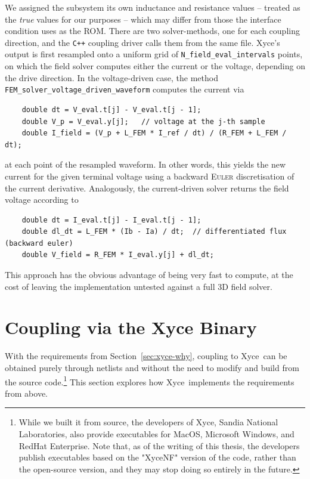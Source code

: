 We assigned the subsystem its own inductance and resistance values -- treated as the \textit{true} values for our purposes -- which may differ from those the interface condition uses as the ROM. There are two solver-methods, one for each coupling direction, and the \lstinline{C++} coupling driver calls them from the same file. Xyce's output is first resampled onto a uniform grid of \lstinline{N_field_eval_intervals} points, on which the field solver computes either the current or the voltage, depending on the drive direction. In the voltage-driven case, the method \lstinline{FEM_solver_voltage_driven_waveform} computes the current via
\begin{lstlisting}
    double dt = V_eval.t[j] - V_eval.t[j - 1];
    double V_p = V_eval.y[j];   // voltage at the j-th sample
    double I_field = (V_p + L_FEM * I_ref / dt) / (R_FEM + L_FEM / dt);
\end{lstlisting}
at each point of the resampled waveform. In other words, this yields the new current for the given terminal voltage using a backward \textsc{Euler} discretisation of the current derivative. Analogously, the current-driven solver returns the field voltage according to
\begin{lstlisting}
    double dt = I_eval.t[j] - I_eval.t[j - 1];
    double dl_dt = L_FEM * (Ib - Ia) / dt;  // differentiated flux (backward euler)
    double V_field = R_FEM * I_eval.y[j] + dl_dt;
\end{lstlisting}

This approach has the obvious advantage of being very fast to compute, at the cost of leaving the implementation untested against a full 3D field solver.


\section{Coupling via the Xyce Binary} \label{sec:xyce-coupling}
With the requirements from Section~\ref{sec:xyce-why}, coupling to Xyce\texttrademark \ can be obtained purely through netlists and without the need to modify and build from the source code.\footnote{While we built it from source, the developers of Xyce\texttrademark, Sandia National Laboratories, also provide executables for MacOS, Microsoft Windows, and RedHat Enterprise. Note that, as of the writing of this thesis, the developers publish executables based on the "XyceNF" version of the code, rather than the open-source version, and they may stop doing so entirely in the future.} This section explores how Xyce\texttrademark \ implements the requirements from above.

